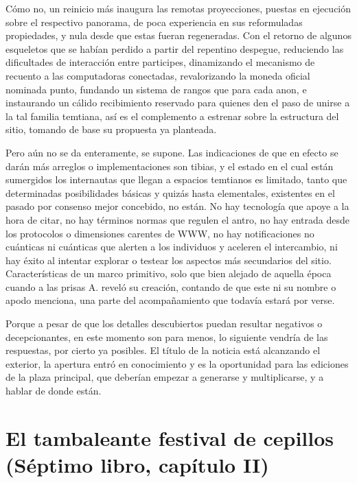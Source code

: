 \documentclass[
]{book}
\begin{document}
Cómo no, un reinicio más inaugura las remotas proyecciones, puestas en ejecución sobre el respectivo panorama, de poca experiencia en sus reformuladas propiedades, y nula desde que estas fueran regeneradas. Con el retorno de algunos esqueletos que se habían perdido a partir del repentino despegue, reduciendo las dificultades de interacción entre participes, dinamizando el mecanismo de recuento a las computadoras conectadas, revalorizando la moneda oficial nominada punto, fundando un sistema de rangos que para cada anon, e instaurando un cálido recibimiento reservado para quienes den el paso de unirse a la tal familia temtiana, así es el complemento a estrenar sobre la estructura del sitio, tomando de base su propuesta ya planteada.

Pero aún no se da enteramente, se supone. Las indicaciones de que en efecto se darán más arreglos o implementaciones son tibias, y el estado en el cual están sumergidos los internautas que llegan a espacios temtianos es limitado, tanto que determinadas posibilidades básicas y quizás hasta elementales, existentes en el pasado por consenso mejor concebido, no están. No hay tecnología que apoye a la hora de citar, no hay términos normas que regulen el antro, no hay entrada desde los protocolos o dimensiones carentes de WWW, no hay notificaciones no cuánticas ni cuánticas que alerten a los individuos y aceleren el intercambio, ni hay éxito al intentar explorar o testear los aspectos más secundarios del sitio. Características de un marco primitivo, solo que bien alejado de aquella época cuando a las prisas A. reveló su creación, contando de que este ni su nombre o apodo menciona, una parte del acompañamiento que todavía estará por verse.

Porque a pesar de que los detalles descubiertos puedan resultar negativos o decepcionantes, en este momento son para menos, lo siguiente vendría de las respuestas, por cierto ya posibles. El título de la noticia está alcanzando el exterior, la apertura entró en conocimiento y es la oportunidad para las ediciones de la plaza principal, que deberían empezar a generarse y multiplicarse, y a hablar de donde están.

\hypertarget{el-tambaleante-festival-de-cepillos-suxe9ptimo-libro-capuxedtulo-ii}{%
\section{El tambaleante festival de cepillos (Séptimo libro, capítulo II)}\label{el-tambaleante-festival-de-cepillos-suxe9ptimo-libro-capuxedtulo-ii}}
\end{document}
